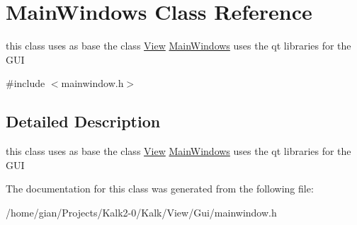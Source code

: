 \hypertarget{class_main_windows}{}\section{Main\+Windows Class Reference}
\label{class_main_windows}


this class uses as base the class \hyperlink{class_view}{View} \hyperlink{class_main_windows}{Main\+Windows} uses the qt libraries for the G\+UI  




{\ttfamily \#include $<$mainwindow.\+h$>$}



\subsection{Detailed Description}
this class uses as base the class \hyperlink{class_view}{View} \hyperlink{class_main_windows}{Main\+Windows} uses the qt libraries for the G\+UI 

The documentation for this class was generated from the following file\+:\begin{DoxyCompactItemize}
\item 
/home/gian/\+Projects/\+Kalk2-\/0/\+Kalk/\+View/\+Gui/mainwindow.\+h\end{DoxyCompactItemize}
